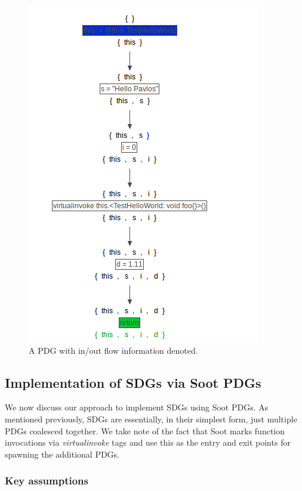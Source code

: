 \documentclass[authoryear,preprint]{sigplanconf}
\begin{document}
\begin{figure}[ht]
	\centering
	\includegraphics[width=.9\linewidth]{figures/Selection_080}
	\caption[A PDG with in/out flow information denoted.]{\label{f:sampInOut}A PDG with in/out flow information denoted.}
\end{figure}


\subsection{Implementation of SDGs via Soot PDGs}

We now discuss our approach to implement SDGs using Soot PDGs. As mentioned previously, SDGs are essentially, in their simplest form, just multiple PDGs coalesced together. We take note of the fact that Soot marks function invocations via \textit{virtualinvoke} tags and use this as the entry and exit points for spawning the additional PDGs.

\subsubsection{Key assumptions}
\end{document}
